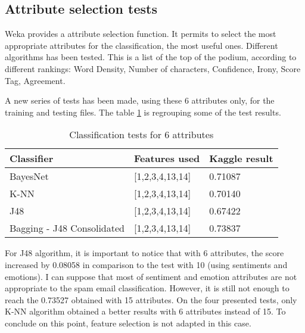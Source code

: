 \documentclass[runningheads]{llncs}
\begin{document}
\subsection{Attribute selection tests}
%
Weka provides a attribute selection function. It permits to select the most appropriate attributes for the classification, the most useful ones. Different algorithms has been tested. This is a list of the top of the podium, according to different rankings: Word Density, Number of characters, Confidence, Irony, Score Tag, Agreement. \par
A new series of tests has been made, using these 6 attributes only, for the training and testing files. The table \ref{tab3} is regrouping some of the test results. \par
%
\begin{table}
\caption{Classification tests for 6 attributes}\label{tab3}
\centering
\begin{tabular}{|l|l|l|}
\hline
Classifier & Features used & Kaggle result \\
\hline \hline
BayesNet & [1,2,3,4,13,14] & 0.71087 \\\hline
K-NN & [1,2,3,4,13,14] & 0.70140 \\\hline
J48 & [1,2,3,4,13,14] & 0.67422 \\\hline
Bagging - J48 Consolidated & [1,2,3,4,13,14] & 0.73837 \\
\hline
\end{tabular}
\end{table}
%
For J48 algorithm, it is important to notice that with 6 attributes, the score increased by 0.08058 in comparison to the test with 10 (using sentiments and emotions). I can suppose that most of sentiment and emotion attributes are not appropriate to the spam email classification. However, it is still not enough to reach the 0.73527 obtained with 15 attributes. On the four presented tests, only K-NN algorithm obtained a better results with 6 attributes instead of 15. To conclude on this point, feature selection is not adapted in this case.
%
\end{document}

